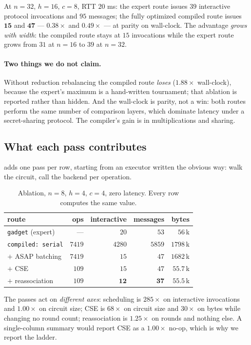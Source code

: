 \documentclass[11pt]{article}
\newcommand{\bt}[1]{\texttt{#1}}
\begin{document}
At $n{=}32$, $h{=}16$, $c{=}8$, RTT $20$ ms: the expert route issues $39$
interactive protocol invocations and $95$ messages; the fully optimized
compiled route issues $\mathbf{15}$ and $\mathbf{47}$ --- $0.38\times$ and
$0.49\times$ --- at parity on wall-clock. The advantage \emph{grows with
width}: the compiled route stays at $15$ invocations while the expert route
grows from $31$ at $n{=}16$ to $39$ at $n{=}32$.

\paragraph{Two things we do not claim.} Without reduction rebalancing the
compiled route \emph{loses} ($1.88\times$ wall-clock), because the expert's
maximum is a hand-written tournament; that ablation is reported rather than
hidden. And the wall-clock is parity, not a win: both routes perform the same
number of comparison layers, which dominate latency under a secret-sharing
protocol. The compiler's gain is in multiplications and sharing.

\subsection{What each pass contributes}\label{sec:ablation}

 adds one pass per row, starting from an executor written
the obvious way: walk the circuit, call the backend per operation.

\begin{table}[t]
\centering
\caption{Ablation, $n{=}8$, $h{=}4$, $c{=}4$, zero latency. Every row computes
the same value.}
\label{tab:ablation}
\begin{tabular}{@{}lrrrr@{}}
\toprule
route & ops & interactive & messages & bytes \\
\midrule
\bt{gadget} (expert) & --- & $20$ & $53$ & $56$\,k \\
\midrule
\bt{compiled: serial} & $7419$ & $4280$ & $5859$ & $1798$\,k \\
\quad $+$ ASAP batching & $7419$ & $15$ & $47$ & $1682$\,k \\
\quad $+$ CSE & $109$ & $15$ & $47$ & $55.7$\,k \\
\quad $+$ reassociation & $109$ & $\mathbf{12}$ & $\mathbf{37}$ & $55.5$\,k \\
\bottomrule
\end{tabular}
\end{table}

The passes act on \emph{different axes}: scheduling is $285\times$ on
interactive invocations and $1.00\times$ on circuit size; CSE is $68\times$ on
circuit size and $30\times$ on bytes while changing no round count;
reassociation is $1.25\times$ on rounds and nothing else. A single-column
summary would report CSE as a $1.00\times$ no-op, which is why we report the
ladder.
\end{document}
